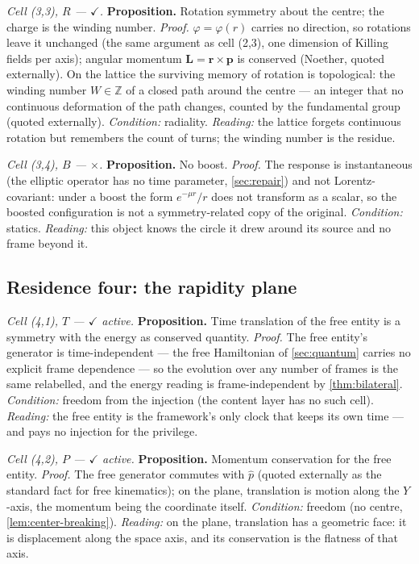 \documentclass[11pt]{amsbook}
\theoremstyle{plain}
\theoremstyle{definition}
\theoremstyle{remark}
\begin{document}
\emph{Cell (3,3), $R$ --- $\checkmark$.} \textbf{Proposition.} Rotation symmetry about the centre; the charge is the winding number. \emph{Proof.} $\varphi = \varphi(r)$ carries no direction, so rotations leave it unchanged (the same argument as cell (2,3), one dimension of Killing fields per axis); angular momentum $\mathbf L = \mathbf r \times \mathbf p$ is conserved (Noether, quoted externally). On the lattice the surviving memory of rotation is topological: the winding number $W \in \mathbb{Z}$ of a closed path around the centre --- an integer that no continuous deformation of the path changes, counted by the fundamental group (quoted externally). \emph{Condition:} radiality. \emph{Reading:} the lattice forgets continuous rotation but remembers the count of turns; the winding number is the residue.

\emph{Cell (3,4), $B$ --- $\times$.} \textbf{Proposition.} No boost. \emph{Proof.} The response is instantaneous (the elliptic operator has no time parameter, \cref{sec:repair}) and not Lorentz-covariant: under a boost the form $e^{-\mu r}/r$ does not transform as a scalar, so the boosted configuration is not a symmetry-related copy of the original. \emph{Condition:} statics. \emph{Reading:} this object knows the circle it drew around its source and no frame beyond it.

\subsection{Residence four: the rapidity plane}\label{sec:grid-plane}

\emph{Cell (4,1), $T$ --- $\checkmark$ active.} \textbf{Proposition.} Time translation of the free entity is a symmetry with the energy as conserved quantity. \emph{Proof.} The free entity's generator is time-independent --- the free Hamiltonian of \cref{sec:quantum} carries no explicit frame dependence --- so the evolution over any number of frames is the same relabelled, and the energy reading is frame-independent by \cref{thm:bilateral}. \emph{Condition:} freedom from the injection (the content layer has no such cell). \emph{Reading:} the free entity is the framework's only clock that keeps its own time --- and pays no injection for the privilege.

\emph{Cell (4,2), $P$ --- $\checkmark$ active.} \textbf{Proposition.} Momentum conservation for the free entity. \emph{Proof.} The free generator commutes with $\hat p$ (quoted externally as the standard fact for free kinematics); on the plane, translation is motion along the $Y$-axis, the momentum being the coordinate itself. \emph{Condition:} freedom (no centre, \cref{lem:center-breaking}). \emph{Reading:} on the plane, translation has a geometric face: it is displacement along the space axis, and its conservation is the flatness of that axis.
\end{document}
